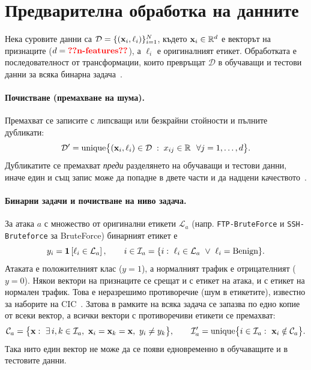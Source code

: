 \section{Предварителна обработка на данните}\label{sec:preprocessing}

Нека суровите данни са $\mathcal{D}=\{(\mathbf{x}_i, \ell_i)\}_{i=1}^{N}$, където $\mathbf{x}_i\in\mathbb{R}^{d}$ е векторът на признаците ($d=\val{n-features}$), а $\ell_i$ е оригиналният етикет. Обработката е последователност от трансформации, които превръщат $\mathcal{D}$ в обучаващи и тестови данни за всяка бинарна задача~\cite{arp2022}.

\paragraph{Почистване (премахване на шума).} Премахват се записите с липсващи или безкрайни стойности и пълните дубликати:
\begin{equation}\label{eq:clean}
\mathcal{D}' = \operatorname{unique}\bigl\{(\mathbf{x}_i,\ell_i)\in\mathcal{D} \;:\; x_{ij}\in\mathbb{R} \ \ \forall j=1,\dots,d\bigr\}.
\end{equation}
Дубликатите се премахват \emph{преди} разделянето на обучаващи и тестови данни, иначе един и същ запис може да попадне в двете части и да надцени качеството~\cite{engelen2021,liu2022}.

\paragraph{Бинарни задачи и почистване на ниво задача.} За атака $a$ с множество от оригинални етикети $\mathcal{L}_a$ (напр. \texttt{FTP-BruteForce} и \texttt{SSH-Bruteforce} за BruteForce) бинарният етикет е
\begin{equation}\label{eq:binary}
y_i = \mathbf{1}\left[\ell_i\in\mathcal{L}_a\right],\qquad i\in\mathcal{I}_a=\{i:\ \ell_i\in\mathcal{L}_a\ \lor\ \ell_i=\txt{Benign}\}.
\end{equation}
Атаката е положителният клас ($y=1$), а нормалният трафик е отрицателният ($y=0$). Някои вектори на признаците се срещат и с етикет на атака, и с етикет на нормален трафик. Това е неразрешимо противоречие (шум в етикетите), известно за наборите на CIC~\cite{liu2022}. Затова в рамките на всяка задача се запазва по едно копие от всеки вектор, а всички вектори с противоречиви етикети се премахват:
\begin{equation}\label{eq:conflict}
\mathcal{C}_a=\bigl\{\vect{x}:\ \exists\,i,k\in\mathcal{I}_a,\ \vect{x}_i=\vect{x}_k=\vect{x},\ y_i\neq y_k\bigr\},\qquad \mathcal{I}_a'=\operatorname{unique}\bigl\{i\in\mathcal{I}_a:\ \vect{x}_i\notin\mathcal{C}_a\bigr\}.
\end{equation}
Така нито един вектор не може да се появи едновременно в обучаващите и в тестовите данни.

